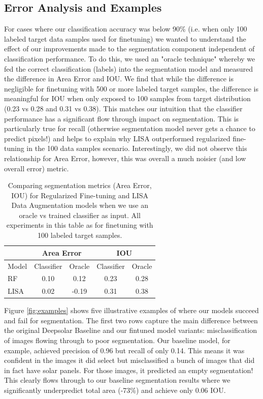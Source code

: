\documentclass[10pt,twocolumn,letterpaper]{article}
\begin{document}
\subsection{Error Analysis and Examples}
For cases where our classification accuracy was below 90\% (i.e. when only 100 labeled target data samples used for finetuning) we wanted to understand the effect of our improvements made to the segmentation component independent of classification performance. To do this, we used an "oracle technique" whereby we fed the correct classification (labels) into the segmentation model and measured the difference in Area Error and IOU. We find that while the difference is negligible for finetuning with 500 or more labeled target samples, the difference is meaningful for IOU when only exposed to 100 samples from target distribution (0.23 vs 0.28 and 0.31 vs 0.38). This matches our intuition that the classifier performance has a significant flow through impact on segmentation. This is particularly true for recall (otherwise segmentation model never gets a chance to predict pixels!) and helps to explain why LISA outperformed regularized fine-tuning in the 100 data samples scenario. Interestingly, we did not observe this relationship for Area Error, however, this was overall a much noisier (and low overall error) metric.

\begin{table}[htp]
\begin{tabular}{lcccc}
& \multicolumn{2}{c}{Area Error} & \multicolumn{2}{c}{IOU} \\ 
\hline
Model  & Classifier & Oracle  & Classifier & Oracle \\ 
\hline
RF  & 0.10  & 0.12   & 0.23  & 0.28   \\
LISA & 0.02  & -0.19  & 0.31  & 0.38  \\ 
\hline
\end{tabular}
\caption{Comparing segmentation metrics (Area Error, IOU) for Regularized Fine-tuning and LISA Data Augmentation models when we use an oracle vs trained classifier as input. All experiments in this table as for finetuning with 100 labeled target samples.}
\label{table:oracle}
\end{table}

Figure \ref{fig:examples} shows five illustrative examples of where our models succeed and fail for segmentation. The first two rows capture the main difference between the original Deepsolar Baseline and our fintuned model variants: misclassification of images flowing through to poor segmentation. Our baseline model, for example, achieved precision of 0.96 but recall of only 0.14. This means it was confident in the images it did select but misclassified a bunch of images that did in fact have solar panels. For those images, it predicted an empty segmentation! This clearly flows through to our baseline segmentation results where we significantly underpredict total area (-73\%) and achieve only 0.06 IOU. 
\end{document}
